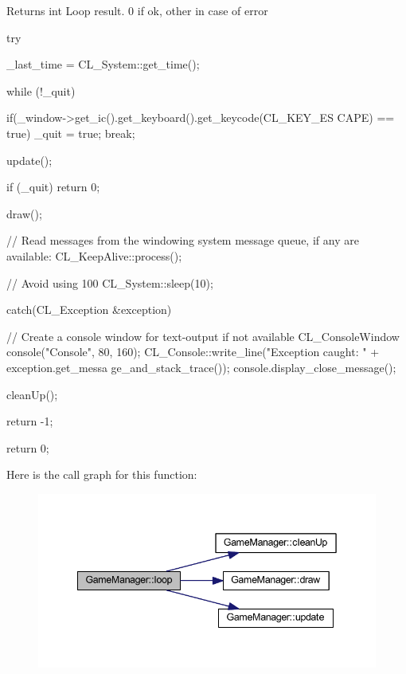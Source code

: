 \begin{DoxyReturn}{Returns}
int Loop result. 0 if ok, other in case of error 
\end{DoxyReturn}

\begin{DoxyCode}
{
        try
        {
                _last_time = CL_System::get_time();

                while (!_quit)
                {
                        if(_window->get_ic().get_keyboard().get_keycode(CL_KEY_ES
      CAPE) == true)
                        {
                                _quit = true;
                                break;
                        }

                        update();

                        if (_quit)
                        {
                                return 0;
                        }

                        draw();

                        // Read messages from the windowing system message queue,
       if any are available:
                        CL_KeepAlive::process();

                        // Avoid using 100%
                        CL_System::sleep(10);
                }
        }
        catch(CL_Exception &exception)
        {
                // Create a console window for text-output if not available
                CL_ConsoleWindow console("Console", 80, 160);
                CL_Console::write_line("Exception caught: " + exception.get_messa
      ge_and_stack_trace());
                console.display_close_message();
                
                cleanUp();

                return -1;
        }

        return 0;
}
\end{DoxyCode}


Here is the call graph for this function:
\nopagebreak
\begin{figure}[H]
\begin{center}
\leavevmode
\includegraphics[width=342pt]{db/d10/class_game_manager_a69bf2ea16980b4ea7f7020a7224275d7_cgraph}
\end{center}
\end{figure}




